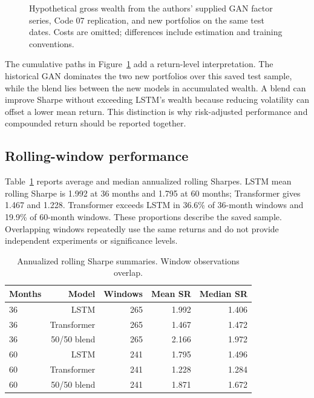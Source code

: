 \documentclass[11pt]{article}
\begin{document}
\begin{figure}[htbp]
\begin{tikzpicture}
\end{tikzpicture}\caption{Hypothetical gross wealth from the authors' supplied GAN factor series, Code 07 replication, and new portfolios on the same test dates. Costs are omitted; differences include estimation and training conventions.}\label{fig:wealth}\end{figure}


The cumulative paths in Figure~\ref{fig:wealth} add a return-level interpretation. The historical GAN dominates the two new portfolios over this saved test sample, while the blend lies between the new models in accumulated wealth. A blend can improve Sharpe without exceeding LSTM's wealth because reducing volatility can offset a lower mean return. This distinction is why risk-adjusted performance and compounded return should be reported together.

\clearpage\subsection{Rolling-window performance}
Table~\ref{tab:rolling} reports average and median annualized rolling Sharpes. LSTM mean rolling Sharpe is 1.992 at 36 months and 1.795 at 60 months; Transformer gives 1.467 and 1.228. Transformer exceeds LSTM in 36.6\% of 36-month windows and 19.9\% of 60-month windows. These proportions describe the saved sample. Overlapping windows repeatedly use the same returns and do not provide independent experiments or significance levels.
\begin{table}[htbp]\centering\small
\caption{Annualized rolling Sharpe summaries. Window observations overlap.}\label{tab:rolling}
\begin{tabular}{lrrrr}
\toprule
Months & Model & Windows & Mean SR & Median SR \\
\midrule
36 & LSTM & 265 & 1.992 & 1.406 \\
36 & Transformer & 265 & 1.467 & 1.472 \\
36 & 50/50 blend & 265 & 2.166 & 1.972 \\
60 & LSTM & 241 & 1.795 & 1.496 \\
60 & Transformer & 241 & 1.228 & 1.284 \\
60 & 50/50 blend & 241 & 1.871 & 1.672 \\
\bottomrule\end{tabular}\end{table}
\end{document}
